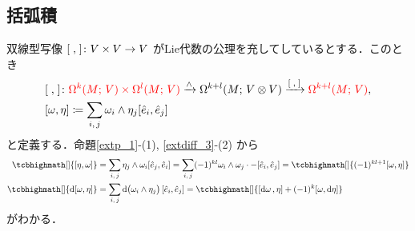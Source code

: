 \documentclass[geometry_main]{subfiles}
\begin{document}
\subsection{括弧積}

双線型写像 $\comm{\;}{\;} \colon V \times V \to V$ がLie代数の公理を充してしているとする．このとき
\begin{align}
	&\comm{\;}{\;} \colon \textcolor{red}{\Omega^k(M;\, V) \times \Omega^l(M;\, V)} \xrightarrow{\wedge} \Omega^{k+l}(M;\, V \otimes V) \xrightarrow{\comm{\;}{\;}} \textcolor{red}{\Omega^{k+l}(M;\, V)},\\
	&\comm{\omega}{\eta} \coloneqq \sum_{i,\, j} \omega_i \wedge \eta_j \comm{\hat{e}_i}{\hat{e}_j}
\end{align}
と定義する．命題\ref{extp_1}-(1), \ref{extdiff_3}-(2) から
\begin{align}
	\tcbhighmath[]{\comm{\eta}{\omega}} &= \sum_{i,\, j} \eta_j \wedge \omega_i \comm{\hat{e}_j}{\hat{e}_i} = \sum_{i,\, j} (-1)^{kl} \omega_i \wedge \omega_j \cdot -\comm{\hat{e}_i}{\hat{e}_j} = \tcbhighmath[]{(-1)^{kl+1} \comm{\omega}{\eta}} \\
	\tcbhighmath[]{\dd{\comm{\omega}{\eta}}} &= \sum_{i,\, j} \dd{\bigl( \omega_i \wedge \eta_j \bigr)} \comm{\hat{e}_i}{\hat{e}_j} = \tcbhighmath[]{\comm{\dd{\omega}}{\eta} + (-1)^k \comm{\omega}{\dd{\eta}} }
\end{align}
がわかる．
\end{document}
